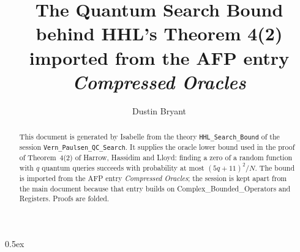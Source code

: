 \documentclass[11pt,a4paper]{article}
\begin{document}
\title{The Quantum Search Bound behind HHL's Theorem 4(2)\\[0.5em]
  \large imported from the AFP entry \emph{Compressed Oracles}}
\author{Dustin Bryant}
\maketitle

\begin{abstract}
This document is generated by Isabelle from the theory \texttt{HHL\_Search\_Bound} of the
session \texttt{Vern\_Paulsen\_QC\_Search}.  It supplies the oracle lower bound used in the
proof of Theorem~4(2) of Harrow, Hassidim and Lloyd: finding a zero of a random function with
$q$ quantum queries succeeds with probability at most $(5q+11)^2/N$.  The bound is imported
from the AFP entry \emph{Compressed Oracles}; the session is kept apart from the main document
because that entry builds on Complex\_Bounded\_Operators and Registers.  Proofs are folded.
\end{abstract}

\parindent 0pt\parskip 0.5ex


\end{document}
